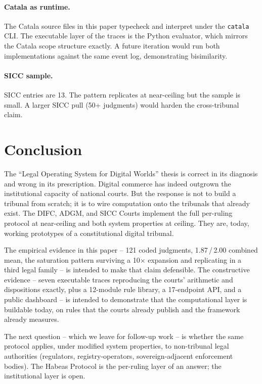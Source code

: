 \documentclass[11pt,letterpaper]{article}
\begin{document}
\paragraph{Catala as runtime.} The Catala source files in this paper typecheck and interpret under the \texttt{catala} CLI. The executable layer of the traces is the Python evaluator, which mirrors the Catala scope structure exactly. A future iteration would run both implementations against the same event log, demonstrating bisimilarity.

\paragraph{SICC sample.} SICC entries are 13. The pattern replicates at near-ceiling but the sample is small. A larger SICC pull (50+ judgments) would harden the cross-tribunal claim.

\section{Conclusion}

The ``Legal Operating System for Digital Worlds'' thesis is correct in its diagnosis and wrong in its prescription. Digital commerce has indeed outgrown the institutional capacity of national courts. But the response is not to build a tribunal from scratch; it is to wire computation onto the tribunals that already exist. The DIFC, ADGM, and SICC Courts implement the full per-ruling protocol at near-ceiling and both system properties at ceiling. They are, today, working prototypes of a constitutional digital tribunal.

The empirical evidence in this paper -- 121 coded judgments, 1.87\,/\,2.00 combined mean, the saturation pattern surviving a 10$\times$ expansion and replicating in a third legal family -- is intended to make that claim defensible. The constructive evidence -- seven executable traces reproducing the courts' arithmetic and dispositions exactly, plus a 12-module rule library, a 17-endpoint API, and a public dashboard -- is intended to demonstrate that the computational layer is buildable today, on rules that the courts already publish and the framework already measures.

The next question -- which we leave for follow-up work -- is whether the same protocol applies, under modified system properties, to non-tribunal legal authorities (regulators, registry-operators, sovereign-adjacent enforcement bodies). The Habeas Protocol is the per-ruling layer of an answer; the institutional layer is open.
\end{document}
